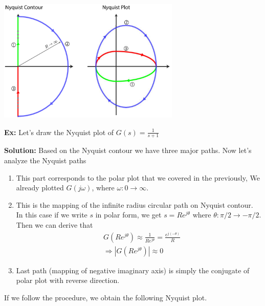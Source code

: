 \documentclass{article}
\begin{document}
  \begin{minipage}[h]{1\linewidth}
    \begin{center}
      \includegraphics[width=0.65\textwidth]{nyq}
    \end{center}
  \end{minipage}

\vspace{12 pt}

\textbf{Ex:} Let's draw the Nyquist plot of $G(s) = \frac{1}{s+1}$ 

\textbf{Solution:}  Based on the Nyquist contour we have three major
paths. Now let's analyze the Nyquist paths
%
\begin{enumerate}
  \item This part corresponds to the polar plot that we covered in the previously, We already 
  plotted $G(j \omega)$, where $\omega : 0 \to \infty$. 
%
  \item This is the mapping of the infinite radius circular path on
    Nyquist contour. In this case if we write $s$ in polar form, we get 
   $s = R e^{j \theta}$ where $\theta : \pi/2 \to -\pi/2$.  Then 
   we can derive that  
   \begin{align*}
     & G \left( R e^{j \theta} \right)  \approx \frac{1}{R e^{j
       \theta}} = \frac{e^{j (-\theta)}}{R}
       \\
    &\Rightarrow | G \left( R e^{j \theta} \right) | \approx 0
   \end{align*}
   \item Last path (mapping of negative imaginary axis) is simply 
    the conjugate of polar plot with reverse direction. 
\end{enumerate}

If we follow the procedure, we obtain the following Nyquist plot. 

\vspace{6 pt}
\end{document}
